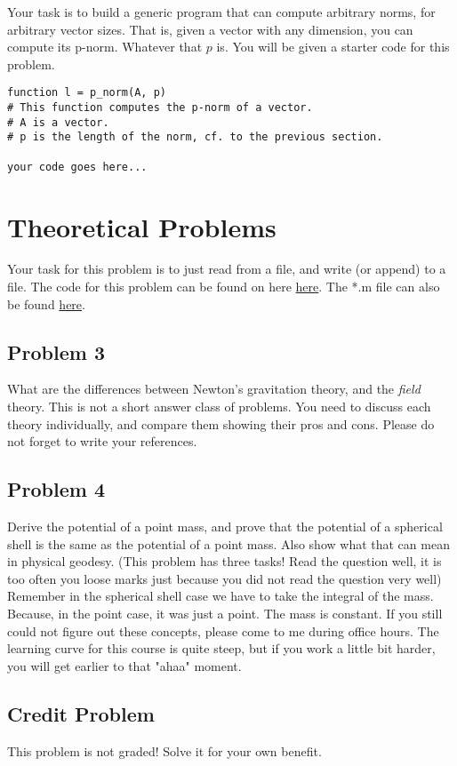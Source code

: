\documentclass[paper=a4, fontsize=11pt]{scrartcl} %
\numberwithin{equation}{section} %
\numberwithin{figure}{section} %
\numberwithin{table}{section} %
\begin{document}
Your task is to build a generic program that can compute arbitrary norms, for arbitrary vector sizes. That is, given a vector with any dimension, you can compute its p-norm. Whatever that $p$ is. You will be given a starter code for this problem.
\cleardoublepage
\begin{verbatim}
function l = p_norm(A, p)
# This function computes the p-norm of a vector.
# A is a vector.
# p is the length of the norm, cf. to the previous section.

your code goes here...
\end{verbatim}

\section{Theoretical Problems}
Your task for this problem is to just read from a file, and write (or append) to a file. The code for this problem can be found on here \href{.run:./programming_problem_2.pdf}{here}. The *.m file can also be found \href{.run:./programming_problem_2.m}{here}.

\subsection{Problem 3}
What are the differences between Newton's gravitation theory, and the \textit{field} theory. This is not a short answer class of problems. You need to discuss each theory individually, and compare them showing their pros and cons. Please do not forget to write your references.

\subsection{Problem 4}
Derive the potential of a point mass, and prove that the potential of a spherical shell is the same as the potential of a point mass. Also show what that can mean in physical geodesy. (This problem has three tasks! Read the question well, it is too often you loose marks just because you did not read the question very well)
\\
Remember in the spherical shell case we have to take the integral of the mass. Because, in the point case, it was just a point. The mass is constant. If you still could not figure out these concepts, please come to me during office hours. The learning curve for this course is quite steep, but if you work a little bit harder, you will get earlier to that "ahaa" moment.

\subsection{Credit Problem}
This problem is not graded! Solve it for your own benefit.
\end{document}
